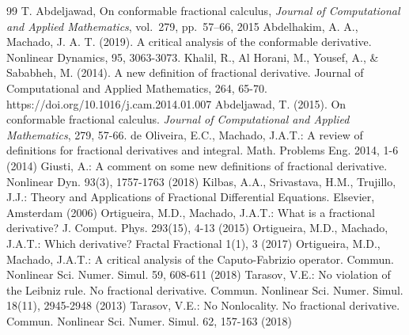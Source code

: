 \documentclass[preprint,12pt]{elsarticle}
\begin{document}
\begin{thebibliography}{99}
 T. Abdeljawad, On conformable fractional calculus, \emph{Journal of Computational and Applied Mathematics}, vol.~279, pp.~57--66, 2015
 Abdelhakim, A. A.,  Machado, J. A. T. (2019). A critical analysis of the conformable derivative. Nonlinear Dynamics, 95, 3063-3073.
 Khalil, R., Al Horani, M., Yousef, A., \& Sababheh, M. (2014). A new definition of fractional derivative. Journal of Computational and Applied Mathematics, 264, 65-70. https://doi.org/10.1016/j.cam.2014.01.007
 Abdeljawad, T. (2015). On conformable fractional calculus. \emph{Journal of Computational and Applied Mathematics}, 279, 57-66.
 de Oliveira, E.C., Machado, J.A.T.: A review of definitions for fractional derivatives and integral. Math. Problems Eng. 2014, 1-6 (2014)
 Giusti, A.: A comment on some new definitions of fractional derivative. Nonlinear Dyn. 93(3), 1757-1763 (2018)
 Kilbas, A.A., Srivastava, H.M., Trujillo, J.J.: Theory and Applications of Fractional Differential Equations. Elsevier, Amsterdam (2006)
 Ortigueira, M.D., Machado, J.A.T.: What is a fractional derivative? J. Comput. Phys. 293(15), 4-13 (2015)
 Ortigueira, M.D., Machado, J.A.T.: Which derivative? Fractal Fractional 1(1), 3 (2017)
 Ortigueira, M.D., Machado, J.A.T.: A critical analysis of the Caputo-Fabrizio operator. Commun. Nonlinear Sci. Numer. Simul. 59, 608-611 (2018)
 Tarasov, V.E.: No violation of the Leibniz rule. No fractional derivative. Commun. Nonlinear Sci. Numer. Simul. 18(11), 2945-2948 (2013)
 Tarasov, V.E.: No Nonlocality. No fractional derivative. Commun. Nonlinear Sci. Numer. Simul. 62, 157-163 (2018)
\end{thebibliography}
\end{document}
